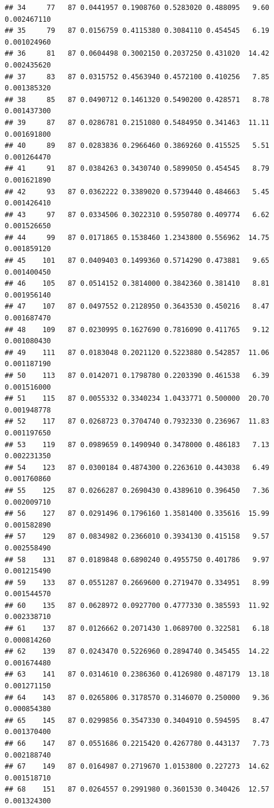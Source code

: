 \documentclass[]{article}
\begin{document}
\begin{verbatim}
## 34     77   87 0.0441957 0.1908760 0.5283020 0.488095   9.60 0.002467110
## 35     79   87 0.0156759 0.4115380 0.3084110 0.454545   6.19 0.001024960
## 36     81   87 0.0604498 0.3002150 0.2037250 0.431020  14.42 0.002435620
## 37     83   87 0.0315752 0.4563940 0.4572100 0.410256   7.85 0.001385320
## 38     85   87 0.0490712 0.1461320 0.5490200 0.428571   8.78 0.001437300
## 39     87   87 0.0286781 0.2151080 0.5484950 0.341463  11.11 0.001691800
## 40     89   87 0.0283836 0.2966460 0.3869260 0.415525   5.51 0.001264470
## 41     91   87 0.0384263 0.3430740 0.5899050 0.454545   8.79 0.001621890
## 42     93   87 0.0362222 0.3389020 0.5739440 0.484663   5.45 0.001426410
## 43     97   87 0.0334506 0.3022310 0.5950780 0.409774   6.62 0.001526650
## 44     99   87 0.0171865 0.1538460 1.2343800 0.556962  14.75 0.001859120
## 45    101   87 0.0409403 0.1499360 0.5714290 0.473881   9.65 0.001400450
## 46    105   87 0.0514152 0.3814000 0.3842360 0.381410   8.81 0.001956140
## 47    107   87 0.0497552 0.2128950 0.3643530 0.450216   8.47 0.001687470
## 48    109   87 0.0230995 0.1627690 0.7816090 0.411765   9.12 0.001080430
## 49    111   87 0.0183048 0.2021120 0.5223880 0.542857  11.06 0.001187190
## 50    113   87 0.0142071 0.1798780 0.2203390 0.461538   6.39 0.001516000
## 51    115   87 0.0055332 0.3340234 1.0433771 0.500000  20.70 0.001948778
## 52    117   87 0.0268723 0.3704740 0.7932330 0.236967  11.83 0.001197650
## 53    119   87 0.0989659 0.1490940 0.3478000 0.486183   7.13 0.002231350
## 54    123   87 0.0300184 0.4874300 0.2263610 0.443038   6.49 0.001760860
## 55    125   87 0.0266287 0.2690430 0.4389610 0.396450   7.36 0.002009710
## 56    127   87 0.0291496 0.1796160 1.3581400 0.335616  15.99 0.001582890
## 57    129   87 0.0834982 0.2366010 0.3934130 0.415158   9.57 0.002558490
## 58    131   87 0.0189848 0.6890240 0.4955750 0.401786   9.97 0.001215490
## 59    133   87 0.0551287 0.2669600 0.2719470 0.334951   8.99 0.001544570
## 60    135   87 0.0628972 0.0927700 0.4777330 0.385593  11.92 0.002338710
## 61    137   87 0.0126662 0.2071430 1.0689700 0.322581   6.18 0.000814260
## 62    139   87 0.0243470 0.5226960 0.2894740 0.345455  14.22 0.001674480
## 63    141   87 0.0314610 0.2386360 0.4126980 0.487179  13.18 0.001271150
## 64    143   87 0.0265806 0.3178570 0.3146070 0.250000   9.36 0.000854380
## 65    145   87 0.0299856 0.3547330 0.3404910 0.594595   8.47 0.001370400
## 66    147   87 0.0551686 0.2215420 0.4267780 0.443137   7.73 0.002188740
## 67    149   87 0.0164987 0.2719670 1.0153800 0.227273  14.62 0.001518710
## 68    151   87 0.0264557 0.2991980 0.3601530 0.340426  12.57 0.001324300

\end{verbatim}
\end{document}
